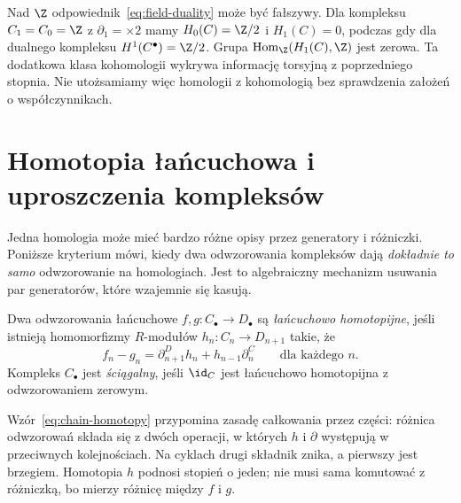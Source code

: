 \begin{uwaga}
Nad $\Z$ odpowiednik~\eqref{eq:field-duality}
może być fałszywy. Dla kompleksu
$C_1=C_0=\Z$ z $\partial_1=\times2$ mamy
$H_0(C)=\Z/2$ i $H_1(C)=0$,
podczas gdy dla dualnego kompleksu
$H^1(C^\bullet)=\Z/2$.
Grupa $\operatorname{Hom}_{\Z}
(H_1(C),\Z)$ jest zerowa.
Ta dodatkowa klasa kohomologii
wykrywa informację torsyjną z
poprzedniego stopnia. Nie utożsamiamy
więc homologii z kohomologią bez
sprawdzenia założeń o współczynnikach.
\end{uwaga}
\section{Homotopia łańcuchowa i uproszczenia kompleksów}
\label{sec:homotopia-lancuchowa}

Jedna homologia może mieć bardzo różne opisy
przez generatory i różniczki. Poniższe kryterium
mówi, kiedy dwa odwzorowania kompleksów dają
\emph{dokładnie to samo} odwzorowanie na
homologiach. Jest to algebraiczny mechanizm
usuwania par generatorów, które wzajemnie
się kasują.

\begin{definicja}
\label{def:homotopia-lancuchowa}
Dwa odwzorowania łańcuchowe $f,g:C_\bullet\to D_\bullet$
są \emph{łańcuchowo homotopijne}, jeśli istnieją
homomorfizmy $R$-modułów $h_n:C_n\to D_{n+1}$ takie, że
\begin{equation}\label{eq:chain-homotopy}
 f_n-g_n=\partial^D_{n+1}h_n+h_{n-1}\partial^C_n
 \qquad\text{dla każdego }n.
\end{equation}
Kompleks $C_\bullet$ jest \emph{ściągalny},
jeśli $\id_C$ jest łańcuchowo homotopijna
z odwzorowaniem zerowym.
\end{definicja}

Wzór~\eqref{eq:chain-homotopy} przypomina
zasadę całkowania przez części: różnica
odwzorowań składa się z dwóch operacji, w których
$h$ i $\partial$ występują w przeciwnych
kolejnościach. Na cyklach drugi składnik
znika, a pierwszy jest brzegiem. Homotopia $h$
podnosi stopień o jeden; nie musi sama komutować
z różniczką, bo mierzy różnicę między $f$ i $g$.

